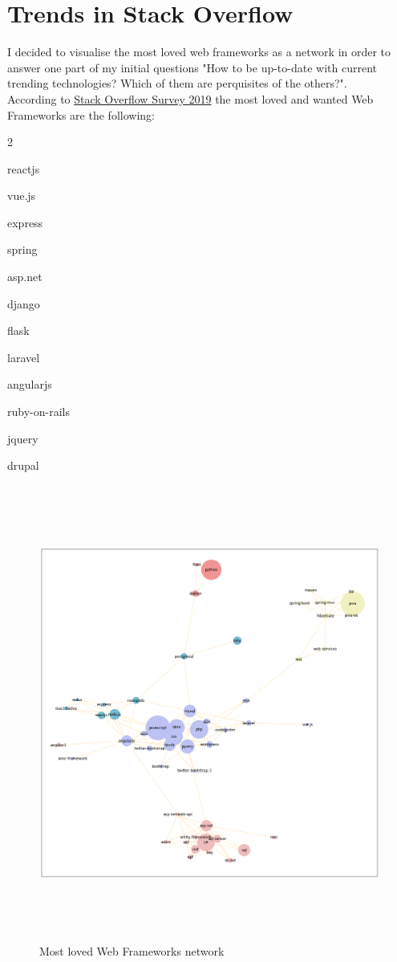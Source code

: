 \documentclass[12pt]{article}
\begin{document}
		\section{Trends in Stack Overflow}
			I decided to visualise the most loved web frameworks as a network in order to answer one part of my initial questions "How to be up-to-date with current trending technologies? Which of them are perquisites of the others?". \\
			According to  \href{https://insights.stackoverflow.com/survey/2019#most-popular-technologies}{Stack Overflow Survey 2019} the most loved and wanted Web Frameworks are the following:
			\begin{enumerate}
			\end{enumerate}
			\begin{figure}[ht]
				\centering
				\includegraphics[width=15cm,height=15cm]{lovedplatforms}
				\caption{Most loved Web Frameworks network}
			\end{figure}
\end{document}

